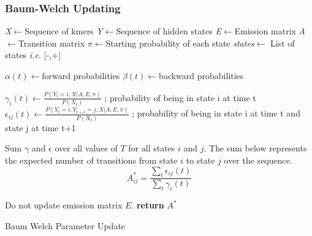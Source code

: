 \subsubsection{Baum-Welch Updating}

\begin{algorithm}[H]
\DontPrintSemicolon
{}
\SetAlgoLined
\emph{X}$\leftarrow$Sequence of kmers\;
\emph{Y}$\leftarrow$Sequence of hidden states\;
\emph{E}$\leftarrow$Emission matrix\;
\emph{A}$\leftarrow$Transition matrix\;
\emph{$\pi$}$\leftarrow$Starting probability of each state\;
\emph{states}$\leftarrow$ List of states \emph{i.e.} [-,+]\;
\;

$\alpha(t)\leftarrow$forward probabilities\;
$\beta(t)\leftarrow$backward probabilities\;\;

$\gamma_{i}(t)\leftarrow \frac{P(Y_t=i,X|A,E,\pi)}{P(X_t)}$ ; probability of being in state i at time t\;
$\epsilon_{ij}(t)\leftarrow \frac{P(Y_t=i,Y_{t+1}=j,X|A,E,\pi)}{P(X_t)}$ ; probability of being in state i at time t and state j at time t+1\;
\;


Sum $\gamma$ and $\epsilon$ over all values of $T$ for all states $i$ and $j$. The sum below represents the expected number of transitions from state $i$ to state $j$ over the sequence. 
$$A^*_{ij} = \frac{\sum_t{\epsilon_{ij}(t)}}{\sum_t{\gamma_{i}(t)}} $$\;

Do not update emission matrix $E$.\;\;
\textbf{return} $A^*$\;

 \caption{Baum Welch Parameter Update}
 \label{bw}
\end{algorithm}

